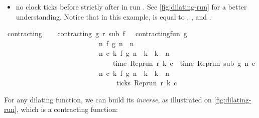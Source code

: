 \begin{isabellebody}
\begin{isamarkuptext}
\begin{itemize}
\begin{itemize}
\item no clock ticks before  strictly after  
in run .
See \autoref{fig:dilating-run} for a better understanding. Notice that in this 
example,  is equal to , , 
and . %
\end{itemize}%
\end{itemize}%
\end{isamarkuptext}\isamarkuptrue%
\isanewline
{}\isamarkupfalse%
\ contracting\isanewline
{}\ \isanewline
\ \ {\isacartoucheopen}contracting\ g\ r\ sub\ f\ {\isasymequiv}\ \ contracting{\isacharunderscore}fun\ g\isanewline
\ \ \ \ \ \ \ \ \ \ \ \ \ \ \ \ \ \ \ \ \ \ \ \ \ \ {\isasymand}\ {\isacharparenleft}{\isasymforall}n{\isachardot}\ f\ {\isacharparenleft}g\ n{\isacharparenright}\ {\isasymle}\ n{\isacharparenright}\isanewline
\ \ \ \ \ \ \ \ \ \ \ \ \ \ \ \ \ \ \ \ \ \ \ \ \ \ {\isasymand}\ {\isacharparenleft}{\isasymforall}n\ c\ k{\isachardot}\ f\ {\isacharparenleft}g\ n{\isacharparenright}\ {\isasymle}\ k\ {\isasymand}\ k\ {\isasymle}\ n\isanewline
\ \ \ \ \ \ \ \ \ \ \ \ \ \ \ \ \ \ \ \ \ \ \ \ \ \ \ \ \ \ {\isasymlongrightarrow}\ time\ {\isacharparenleft}{\isacharparenleft}Rep{\isacharunderscore}run\ r{\isacharparenright}\ k\ c{\isacharparenright}\ {\isacharequal}\ time\ {\isacharparenleft}{\isacharparenleft}Rep{\isacharunderscore}run\ sub{\isacharparenright}\ {\isacharparenleft}g\ n{\isacharparenright}\ c{\isacharparenright}{\isacharparenright}\isanewline
\ \ \ \ \ \ \ \ \ \ \ \ \ \ \ \ \ \ \ \ \ \ \ \ \ \ {\isasymand}\ {\isacharparenleft}{\isasymforall}n\ c\ k{\isachardot}\ f\ {\isacharparenleft}g\ n{\isacharparenright}\ {\isacharless}\ k\ {\isasymand}\ k\ {\isasymle}\ n\isanewline
\ \ \ \ \ \ \ \ \ \ \ \ \ \ \ \ \ \ \ \ \ \ \ \ \ \ \ \ \ \ {\isasymlongrightarrow}\ {\isasymnot}\ ticks\ {\isacharparenleft}{\isacharparenleft}Rep{\isacharunderscore}run\ r{\isacharparenright}\ k\ c{\isacharparenright}{\isacharparenright}{\isacartoucheclose}%
\begin{isamarkuptext}%
For any dilating function, we can build its \emph{inverse}, as illustrated on
  \autoref{fig:dilating-run}, which is a contracting function:%
\end{isamarkuptext}\isamarkuptrue%
\isamarkupfalse%

\end{isabellebody}
